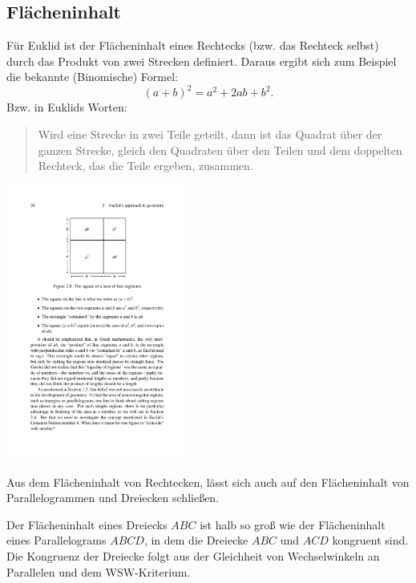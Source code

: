 \subsection*{Flächeninhalt}

Für Euklid ist der Flächeninhalt eines Rechtecks (bzw. das Rechteck selbst) durch das Produkt von
zwei Strecken definiert.  Daraus ergibt sich zum Beispiel die bekannte (Binomische) Formel:
$$
    (a+b)^2=a^2+2ab+b^2.
$$
Bzw. in Euklids Worten:
\begin{quote}
    Wird eine Strecke in zwei Teile geteilt, dann ist das Quadrat über der ganzen Strecke, gleich
    den Quadraten über den Teilen und dem doppelten Rechteck, das die Teile ergeben, zusammen.
\end{quote}

\begin{center}
    \includegraphics[width=6cm]{BILDER/BildBinomischeFormel.pdf}
\end{center}

Aus dem Flächeninhalt von Rechtecken, lässt sich auch auf den Flächeninhalt von Parallelogrammen und
Dreiecken schließen.


Der Flächeninhalt eines Dreiecks $ABC$ ist halb so groß wie der Flächeninhalt eines Parallelograms
$ABCD$, in dem die Dreiecke $ABC$ und $ACD$ kongruent sind. Die Kongruenz der Dreiecke folgt aus
der Gleichheit von Wechselwinkeln an Parallelen und dem WSW-Kriterium.

